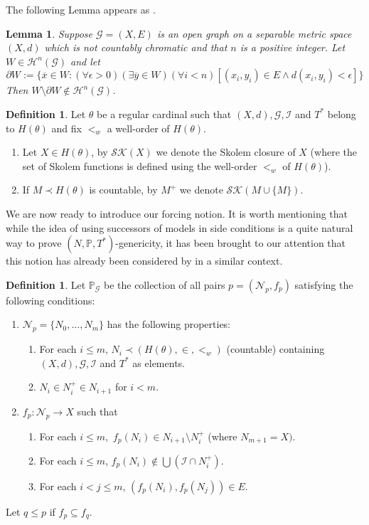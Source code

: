 \documentclass{amsart}
\newtheorem{lemma}[theorem]{Lemma}
\theoremstyle{definition}
\newtheorem{definition}[theorem]{Definition}
\renewcommand{\P}{\mathbb{P}}
\begin{document}
 The following Lemma appears as \cite[Lemma 5.1]{Todorcevic2011}.
\begin{lemma}
    Suppose $\mathcal{G} = (X,E)$ is an open graph on a separable metric space $(X,d)$ which is not countably chromatic and that $n$ is a positive integer. Let $W \in \mathcal{H}^n(\mathcal{G})$ and let
$$
\partial W := \{\overline{x}\in W : (\forall \epsilon > 0)(\exists \overline{y}\in W )(\forall i < n)[(x_i,y_i) \in E \wedge d(x_i,y_i) < \epsilon]\}
$$
Then $W \setminus \partial W \notin \mathcal{H}^n(\mathcal{G})$.
\end{lemma}
\begin{definition}

Let $\theta$ be a regular cardinal such that $(X,d), \mathcal{G}, \mathcal{I}$ and $T^*$ belong to $H(\theta)$ and fix $<_w$ a well-order of $H(\theta)$.
\begin{enumerate}
    \item[(i)]  Let $X \in H(\theta)$, by $\mathcal{SK}(X)$ we denote the Skolem closure of $X$ (where the set of Skolem functions is defined using the  well-order $<_w$ of $H(\theta)$).
\item[(ii)]  If $M \prec H(\theta)$ is countable, by $M^+$ we denote $\mathcal{SK}(M \cup \{M\})$.
\end{enumerate}
\end{definition}
We are now ready to introduce our forcing notion. It is worth mentioning that while the idea of using successors of models in side conditions is a quite natural way to prove $(N,\P,T^*)$-genericity, it has been brought to our attention that this notion has already been considered by \cite{KuzeljavicTodorcevic2020} in a similar context.
\begin{definition}
Let $\P_{\mathcal{G}}$ be the collection of all pairs $p=(\mathcal{N}_p,f_p)$ satisfying the following conditions:
\begin{enumerate}[{\rm (i)}]
    \item $\mathcal{N}_p=\{N_0,\dots,N_{m}\}$ has the following properties:
    \begin{enumerate}[{\rm (a)}]
        \item For each $i\leq m$, $N_i \prec(H(\theta),\in,<_w)$ (countable)  containing $(X,d), \mathcal{G}, \mathcal{I}$ and $T^*$ as elements.

    \item $N_i\in N_i^+\in N_{i+1}$ for $i<m$.
    \end{enumerate}
\item $f_p:\mathcal{N}_p\to X$ such that
\begin{enumerate}[{\rm (a)}]
    \item For each $i\leq m,$ $f_p(N_i)\in N_{i+1}\setminus N_i^+$ (where $N_{m+1}=X)$.
    \item For each $i\leq m$, $f_p(N_i)\notin \bigcup (\mathcal{I}\cap N_i^+)$.
    \item For each $i<j\leq m$, $(f_p(N_i),f_p(N_j))\in E.$
\end{enumerate}
\end{enumerate}
Let $q\leq p$ if $f_p\subseteq f_q$.
\end{definition}
\end{document}
